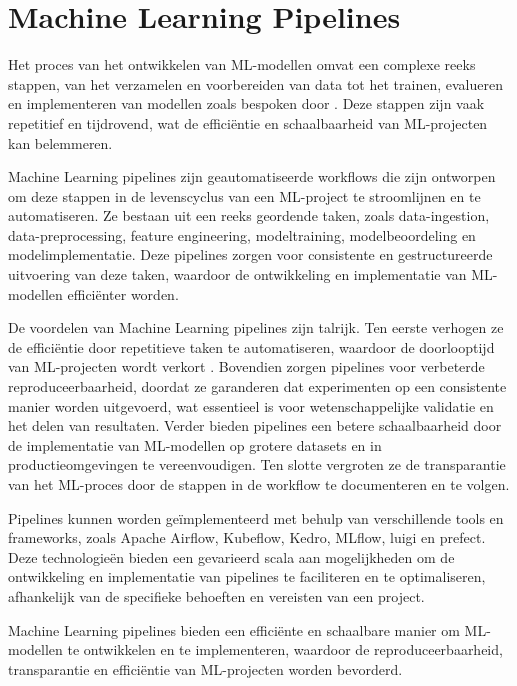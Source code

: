 \section{Machine Learning Pipelines}

Het proces van het ontwikkelen van ML-modellen omvat een complexe reeks stappen, van het verzamelen en voorbereiden van data tot het trainen, evalueren en implementeren van modellen zoals bespoken door \textcite{Vadavalasa2020}. Deze stappen zijn vaak repetitief en tijdrovend, wat de efficiëntie en schaalbaarheid van ML-projecten kan belemmeren.

Machine Learning pipelines zijn geautomatiseerde workflows die zijn ontworpen om deze stappen in de levenscyclus van een ML-project te stroomlijnen en te automatiseren. Ze bestaan uit een reeks geordende taken, zoals data-ingestion, data-preprocessing, feature engineering, modeltraining, modelbeoordeling en modelimplementatie. Deze pipelines zorgen voor consistente en gestructureerde uitvoering van deze taken, waardoor de ontwikkeling en implementatie van ML-modellen efficiënter worden.

De voordelen van Machine Learning pipelines zijn talrijk. Ten eerste verhogen ze de efficiëntie door repetitieve taken te automatiseren, waardoor de doorlooptijd van ML-projecten wordt verkort \autocite{Vadavalasa2020}. Bovendien zorgen pipelines voor verbeterde reproduceerbaarheid, doordat ze garanderen dat experimenten op een consistente manier worden uitgevoerd, wat essentieel is voor wetenschappelijke validatie en het delen van resultaten. Verder bieden pipelines een betere schaalbaarheid door de implementatie van ML-modellen op grotere datasets en in productieomgevingen te vereenvoudigen. Ten slotte vergroten ze de transparantie van het ML-proces door de stappen in de workflow te documenteren en te volgen.

Pipelines kunnen worden geïmplementeerd met behulp van verschillende tools en frameworks, zoals Apache Airflow, Kubeflow, Kedro, MLflow, luigi en prefect. Deze technologieën bieden een gevarieerd scala aan mogelijkheden om de ontwikkeling en implementatie van pipelines te faciliteren en te optimaliseren, afhankelijk van de specifieke behoeften en vereisten van een project.

Machine Learning pipelines bieden een efficiënte en schaalbare manier om ML-modellen te ontwikkelen en te implementeren, waardoor de reproduceerbaarheid, transparantie en efficiëntie van ML-projecten worden bevorderd.


